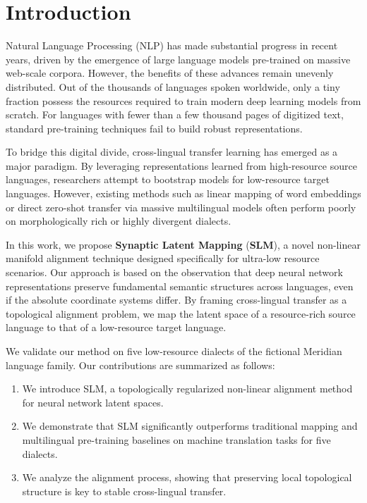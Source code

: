 \section{Introduction}
Natural Language Processing (NLP) has made substantial progress in recent years, driven by the emergence of large language models pre-trained on massive web-scale corpora. However, the benefits of these advances remain unevenly distributed. Out of the thousands of languages spoken worldwide, only a tiny fraction possess the resources required to train modern deep learning models from scratch. For languages with fewer than a few thousand pages of digitized text, standard pre-training techniques fail to build robust representations.

To bridge this digital divide, cross-lingual transfer learning has emerged as a major paradigm. By leveraging representations learned from high-resource source languages, researchers attempt to bootstrap models for low-resource target languages. However, existing methods such as linear mapping of word embeddings \citep{zhang2025crosslingual} or direct zero-shot transfer via massive multilingual models \citep{adams2021neural} often perform poorly on morphologically rich or highly divergent dialects.

In this work, we propose \textbf{Synaptic Latent Mapping} (\textbf{SLM}), a novel non-linear manifold alignment technique designed specifically for ultra-low resource scenarios. Our approach is based on the observation that deep neural network representations preserve fundamental semantic structures across languages, even if the absolute coordinate systems differ. By framing cross-lingual transfer as a topological alignment problem, we map the latent space of a resource-rich source language to that of a low-resource target language.

We validate our method on five low-resource dialects of the fictional Meridian language family. Our contributions are summarized as follows:
\begin{enumerate}
    \item We introduce SLM, a topologically regularized non-linear alignment method for neural network latent spaces.
    \item We demonstrate that SLM significantly outperforms traditional mapping and multilingual pre-training baselines on machine translation tasks for five dialects.
    \item We analyze the alignment process, showing that preserving local topological structure is key to stable cross-lingual transfer.
\end{enumerate}

